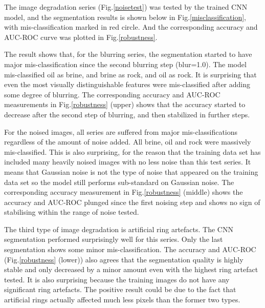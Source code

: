 \documentclass[draft,linenumbers]{agujournal2018}
\begin{document}
 The image degradation series (Fig.\ref{noisetest}) was tested by the trained CNN model, and the segmentation results is shown below in Fig.\ref{misclassification}, with mis-classification marked in red circle. And the corresponding accuracy and AUC-ROC curve was plotted in Fig.\ref{robustness}.
 
 The result shows that, for the blurring series, the segmentation started to have major mis-classification since the second blurring step (blur=1.0). The model mis-classified oil as brine, and brine as rock, and oil as rock. It is surprising that even the most visually distinguishable features were mis-classified after adding some degree of blurring. The corresponding accuracy and AUC-ROC measurements in Fig.\ref{robustness} (upper) shows that the accuracy started to decrease after the second step of blurring, and then stabilized in further steps.
 
 For the noised images, all series are suffered from major mis-classifications regardless of the amount of noise added. All brine, oil and rock were massively mis-classified. This is also surprising, for the reason that the training data set has included many heavily noised images with no less noise than this test series. It means that Gaussian noise is not the type of noise that appeared on the training data set so the model still performs sub-standard on Gaussian noise. The corresponding accuracy measurement in Fig.\ref{robustness} (middle) shows the accuracy and AUC-ROC plunged since the first noising step and shows no sign of stabilising within the range of noise tested.
 
 The third type of image degradation is artificial ring artefacts. The CNN segmentation performed surprisingly well for this series. Only the last segmentation shows some minor mis-classification. The accuracy and AUC-ROC (Fig.\ref{robustness} (lower)) also agrees that the segmentation quality is highly stable and only decreased by a minor amount even with the highest ring artefact tested. It is also surprising because the training images do not have any significant ring artefacts. The positive result could be due to the fact that artificial rings actually affected much less pixels than the former two types.
 
\end{document}
